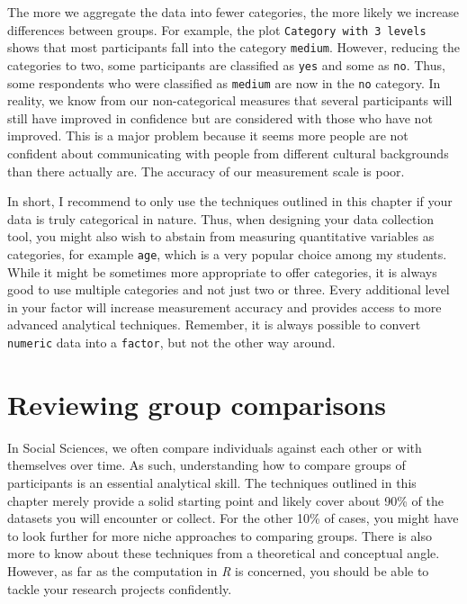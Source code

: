 \documentclass[
  letterpaper,
  DIV=11,
  numbers=noendperiod]{scrreprt}
\begin{document}
The more we aggregate the data into fewer categories, the more likely we
increase differences between groups. For example, the plot
\texttt{Category\ with\ 3\ levels} shows that most participants fall
into the category \texttt{medium}. However, reducing the categories to
two, some participants are classified as \texttt{yes} and some as
\texttt{no}. Thus, some respondents who were classified as
\texttt{medium} are now in the \texttt{no} category. In reality, we know
from our non-categorical measures that several participants will still
have improved in confidence but are considered with those who have not
improved. This is a major problem because it seems more people are not
confident about communicating with people from different cultural
backgrounds than there actually are. The accuracy of our measurement
scale is poor.

In short, I recommend to only use the techniques outlined in this
chapter if your data is truly categorical in nature. Thus, when
designing your data collection tool, you might also wish to abstain from
measuring quantitative variables as categories, for example
\texttt{age}, which is a very popular choice among my students. While it
might be sometimes more appropriate to offer categories, it is always
good to use multiple categories and not just two or three. Every
additional level in your factor will increase measurement accuracy and
provides access to more advanced analytical techniques. Remember, it is
always possible to convert \texttt{numeric} data into a \texttt{factor},
but not the other way around.

\section{Reviewing group
comparisons}\label{sec-reviewing-group-comparisons}

In Social Sciences, we often compare individuals against each other or
with themselves over time. As such, understanding how to compare groups
of participants is an essential analytical skill. The techniques
outlined in this chapter merely provide a solid starting point and
likely cover about 90\% of the datasets you will encounter or collect.
For the other 10\% of cases, you might have to look further for more
niche approaches to comparing groups. There is also more to know about
these techniques from a theoretical and conceptual angle. However, as
far as the computation in \emph{R} is concerned, you should be able to
tackle your research projects confidently.
\end{document}
